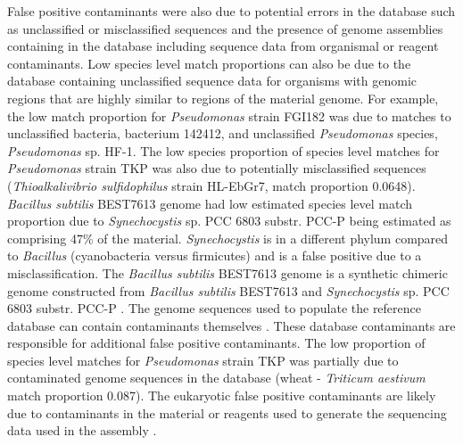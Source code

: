 \documentclass[fleqn,10pt,lineno]{wlpeerj}\usepackage[]{graphicx}\usepackage[]{color}
\begin{document}
False positive contaminants were also due to potential errors in the database such as unclassified or misclassified sequences and the presence of genome assemblies containing in the database including sequence data from organismal or reagent contaminants. 
Low species level match proportions can also be due to the database containing unclassified sequence data for organisms with genomic regions that are highly similar to regions of the material genome. 
For example, the low match proportion for \textit{Pseudomonas} strain FGI182 was due to matches to unclassified bacteria, bacterium 142412, and unclassified \textit{Pseudomonas} species, \textit{Pseudomonas} sp. HF-1. 
The low species proportion of species level matches for \textit{Pseudomonas} strain TKP was also due to potentially misclassified sequences (\textit{Thioalkalivibrio sulfidophilus} strain HL-EbGr7, match proportion 0.0648).
\textit{Bacillus subtilis} BEST7613 genome had low estimated species level match proportion due to \textit{Synechocystis} sp. PCC 6803 substr. PCC-P being estimated as comprising 47\% of the material. 
\textit{Synechocystis} is in a different phylum compared to \textit{Bacillus} (cyanobacteria versus firmicutes) and is a false positive due to a misclassification. 
The \textit{Bacillus subtilis} BEST7613 genome is a synthetic chimeric genome constructed from \textit{Bacillus subtilis} BEST7613 and \textit{Synechocystis} sp. PCC 6803 substr. PCC-P \citep{watanabe2012complete}. 
The genome sequences used to populate the reference database can contain contaminants themselves \citep{parks2015checkm}. 
These database contaminants are responsible for additional false positive contaminants.
The low proportion of species level matches for \textit{Pseudomonas} strain TKP was partially due to contaminated genome sequences in the database (wheat - \textit{Triticum aestivum} match proportion 0.087). 
The eukaryotic false positive contaminants are likely due to contaminants in the material or reagents used to generate the sequencing data used in the assembly \citep{parks2015checkm}. 
\end{document}

